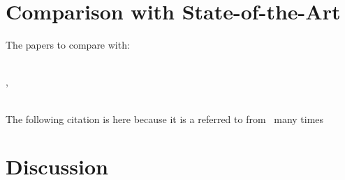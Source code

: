 %
%
%

\section{Comparison with State-of-the-Art}%
\label{sec:compare_with_related_papers}

The papers to compare with:\newline

\\

\cite{sabbaghnovin_model_2021},


\\
\cite{novin_dynamic_2018}
The following \cite{novin_dynamic_2018} citation is here because it is a referred to from~\cite{sabbaghnovin_model_2021} many times




\section{Discussion}%
\label{sec:discussion}
